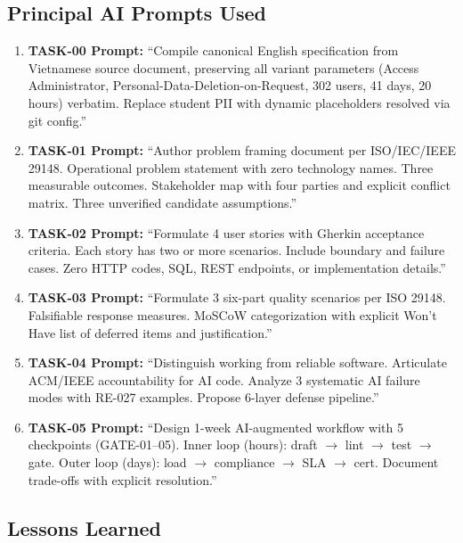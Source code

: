 \documentclass[10pt,a4paper]{article}
\begin{document}
\subsection*{Principal AI Prompts Used}

\begin{enumerate}[leftmargin=*]
 \item \textbf{TASK-00 Prompt:} ``Compile canonical English specification from Vietnamese source document, preserving all variant parameters (Access Administrator, Personal-Data-Deletion-on-Request, 302 users, 41 days, 20 hours) verbatim. Replace student PII with dynamic placeholders resolved via git config.''
 \item \textbf{TASK-01 Prompt:} ``Author problem framing document per ISO/IEC/IEEE 29148. Operational problem statement with zero technology names. Three measurable outcomes. Stakeholder map with four parties and explicit conflict matrix. Three unverified candidate assumptions.''
 \item \textbf{TASK-02 Prompt:} ``Formulate 4 user stories with Gherkin acceptance criteria. Each story has two or more scenarios. Include boundary and failure cases. Zero HTTP codes, SQL, REST endpoints, or implementation details.''
 \item \textbf{TASK-03 Prompt:} ``Formulate 3 six-part quality scenarios per ISO 29148. Falsifiable response measures. MoSCoW categorization with explicit Won't Have list of deferred items and justification.''
 \item \textbf{TASK-04 Prompt:} ``Distinguish working from reliable software. Articulate ACM/IEEE accountability for AI code. Analyze 3 systematic AI failure modes with RE-027 examples. Propose 6-layer defense pipeline.''
 \item \textbf{TASK-05 Prompt:} ``Design 1-week AI-augmented workflow with 5 checkpoints (GATE-01--05). Inner loop (hours): draft $\rightarrow$ lint $\rightarrow$ test $\rightarrow$ gate. Outer loop (days): load $\rightarrow$ compliance $\rightarrow$ SLA $\rightarrow$ cert. Document trade-offs with explicit resolution.''
\end{enumerate}

\subsection*{Lessons Learned}
\end{document}
